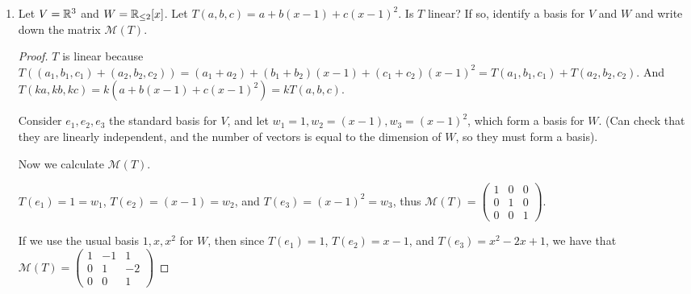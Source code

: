 \documentclass{amsart}
\begin{document}
	\begin{enumerate}
		\item 	Let $V=\mathbb{R}^3$ and $W = \mathbb{R}_{\leq 2}[x]$. Let $T(a,b,c)=a+b(x-1)+c(x-1)^2$. Is $T$ linear? If so, identify a basis for $V$ and $W$ and write down the matrix $\mathcal{M}(T)$.\begin{proof}
			$T$ is linear because $T((a_1,b_1,c_1)+(a_2,b_2,c_2))=(a_1+a_2)+(b_1+b_2)(x-1)+(c_1+c_2)(x-1)^2=T(a_1,b_1,c_1)+T(a_2,b_2,c_2)$. And $T(ka,kb,kc)=k(a+b(x-1)+c(x-1)^2)=kT(a,b,c)$.
			
			Consider $e_1,e_2,e_3$ the standard basis for $V$, and let $w_1=1,w_2=(x-1),w_3=(x-1)^2$, which form a basis for $W$. (Can check that they are linearly independent, and the number of vectors is equal to the dimension of $W$, so they must form a basis).
			
			Now we calculate $\mathcal M(T)$.
			
			$T(e_1)=1=w_1$, $T(e_2)=(x-1)=w_2$, and $T(e_3)=(x-1)^2=w_3$, thus $\mathcal M(T)=\begin{pmatrix}
				1&0&0\\0&1&0\\0&0&1
			\end{pmatrix}$.
			
			If we use the usual basis $1,x,x^2$ for $W$, then since
			$T(e_1)=1$, $T(e_2)=x-1$, and $T(e_3)=x^2-2x+1$, we have that 
			$\mathcal M(T)=\begin{pmatrix}
				1&-1&1\\
				0&1&-2\\
				0&0&1
			\end{pmatrix}$
			

\end{proof}
\end{enumerate}
\end{document}
